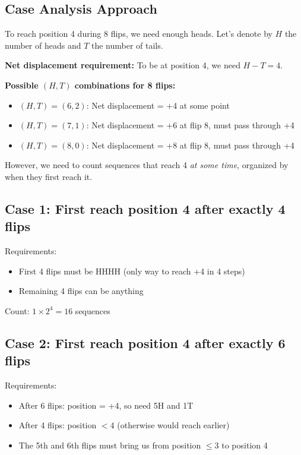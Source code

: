 \documentclass[]{article}
\begin{document}
\subsection*{Case Analysis Approach}

To reach position 4 during 8 flips, we need enough heads. Let's denote by $H$ the number of heads and $T$ the number of tails.

\textbf{Net displacement requirement:} To be at position 4, we need $H - T = 4$.

\textbf{Possible $(H,T)$ combinations for 8 flips:}
\begin{itemize}
    \item $(H,T) = (6,2)$: Net displacement = +4 at some point
    \item $(H,T) = (7,1)$: Net displacement = +6 at flip 8, must pass through +4
    \item $(H,T) = (8,0)$: Net displacement = +8 at flip 8, must pass through +4
\end{itemize}

However, we need to count sequences that reach 4 \textit{at some time}, organized by when they first reach it.

\subsection*{Case 1: First reach position 4 after exactly 4 flips}

Requirements:
\begin{itemize}
    \item First 4 flips must be HHHH (only way to reach +4 in 4 steps)
    \item Remaining 4 flips can be anything
\end{itemize}

Count: $1 \times 2^4 = 16$ sequences

\subsection*{Case 2: First reach position 4 after exactly 6 flips}

Requirements:
\begin{itemize}
    \item After 6 flips: position = +4, so need 5H and 1T
    \item After 4 flips: position $< 4$ (otherwise would reach earlier)
    \item The 5th and 6th flips must bring us from position $\leq 3$ to position 4
\end{itemize}
\end{document}
